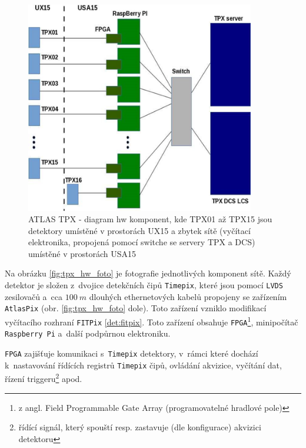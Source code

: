 \begin{figure}[t]
	\begin{center}
		\includegraphics[width=10cm]{figures/tpx_hw_diagram.png}
		\caption{ATLAS TPX - diagram hw komponent, kde TPX01 až TPX15 jsou detektory umístěné v prostorách UX15 a zbytek sítě (vyčítací elektronika, propojená pomocí switche se servery TPX a DCS) umístěné v prostorách USA15}
		\label{fig:tpx_hw_diagram}
	\end{center}
\end{figure}

Na obrázku \ref{fig:tpx_hw_foto} je fotografie jednotlivých komponent sítě. Každý detektor je složen z~dvojice detekčních čipů \texttt{Timepix}, které jsou pomocí \texttt{LVDS} zesilovačů a~cca $100~m$ dlouhých ethernetových kabelů propojeny se zařízením \texttt{AtlasPix} (obr. \ref{fig:tpx_hw_foto} dole). Toto zařízení vzniklo modifikací vyčítacího rozhraní \texttt{FITPix} \ref{det:fitpix}. Toto zařízení obsahuje \texttt{FPGA}\footnote{z angl. Field Programmable Gate Array (programovatelné hradlové pole)}, minipočítač \texttt{Raspberry Pi} a~další podpůrnou elektroniku. 

\texttt{FPGA} zajišťuje komunikaci s~\texttt{Timepix} detektory, v~rámci které dochází k~nastavování řídících registrů \texttt{Timepix} čipů, ovládání akvizice, vyčítání dat, řízení triggeru\footnote{řídící signál, který spouští resp. zastavuje (dle konfigurace) akvizici detektoru} apod.

